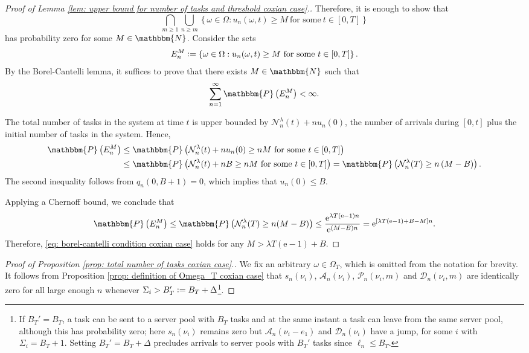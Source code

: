 \documentclass[a4paper, 12pt]{article}
\theoremstyle{definition}
\newcommand{\set}[2]{\left\{#1 : #2\right\}}
\newcommand{\defeq}{\vcentcolon=}
\newcommand{\prob}{\mathbbm{P}}
\newcommand{\calA}{\mathcal{A}}
\newcommand{\calD}{\mathcal{D}}
\newcommand{\calN}{\mathcal{N}}
\newcommand{\calP}{\mathcal{P}}
\newcommand{\N}{\mathbbm{N}}
\newcommand{\e}{\mathrm{e}}
\begin{document}
\begin{appendices}
\begin{proof}[Proof of Lemma \ref{lem: upper bound for number of tasks and threshold coxian case}.]
	Therefore, it is enough to show that
	\begin{equation*}
		\bigcap_{m \geq 1} \bigcup_{n \geq m} \set{\omega \in \Omega}{u_n(\omega, t) \geq M\ \text{for some}\ t \in [0, T]}
	\end{equation*}
	has probability zero for some $M \in \N$. Consider the sets
	\begin{equation*}
		E_n^M \defeq \set{\omega \in \Omega}{u_n(\omega, t) \geq M\ \text{for some}\ t \in [0, T]}.
	\end{equation*}
	By the Borel-Cantelli lemma, it suffices to prove that there exists $M \in \N$ such that
	\begin{equation}
		\label{eq: borel-cantelli condition coxian case}
		\sum_{n = 1}^\infty \prob\left(E_n^M\right) < \infty.
	\end{equation}
	
	The total number of tasks in the system at time $t$ is upper bounded by $\calN_n^\lambda(t) + nu_n(0)$, the number of arrivals during $[0, t]$ plus the initial number of tasks in the system. Hence,
	\begin{align*}
		\prob\left(E_n^M\right) &\leq \prob \left(\calN_n^\lambda(t) + nu_n(0) \geq nM \ \text{for some} \ t \in [0, T]\right) \\
		&\leq \prob \left(\calN_n^\lambda(t) + n B \geq nM \ \text{for some} \ t \in [0, T]\right) = \prob \left(\calN_n^\lambda(T) \geq n\left(M - B\right) \right).
	\end{align*}
	The second inequality follows from $q_n(0, B + 1) = 0$, which implies that $u_n(0) \leq B$.
	
	Applying a Chernoff bound, we conclude that
	\begin{align*}
		\prob\left(E_n^M\right) \leq \prob\left(\calN_n^\lambda(T) \geq n(M - B) \right) \leq \frac{\e^{\lambda T \left(\e - 1\right)n}}{\e^{(M - B)n}} = \e^{\left[\lambda T(\e - 1) + B - M\right]n}.
	\end{align*}
	Therefore, \eqref{eq: borel-cantelli condition coxian case} holds for any $M > \lambda T (\e - 1) + B$.
	\end{proof}
	
	\begin{proof}[Proof of Proposition \ref{prop: total number of tasks coxian case}.]
	We fix an arbitrary $\omega \in \Omega_T$, which is omitted from the notation for brevity. It follows from Proposition \ref{prop: definition of Omega_T coxian case} that $s_n(\nu_i)$, $\calA_n(\nu_i)$, $\calP_n(\nu_i, m)$ and $\calD_n(\nu_i, m)$ are identically zero for all large enough $n$ whenever $\Sigma_i > B_T' \defeq B_T + \Delta$\footnote{If $B_T' = B_T$, a task can be sent to a server pool with $B_T$ tasks and at the same instant a task can leave from the same server pool, although this has probability zero; here $s_n(\nu_i)$ remains zero but $\calA_n(\nu_i - e_1)$ and $\calD_n(\nu_i)$ have a jump, for some $i$ with $\Sigma_i = B_T + 1$. Setting $B_T' = B_T + \Delta$ precludes arrivals to server pools with $B_T'$ tasks since $\ell_n \leq B_T$.}.
	

\end{proof}
\end{appendices}
\end{document}
